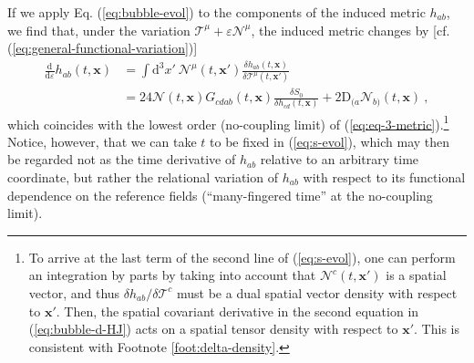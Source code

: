 \documentclass[12pt]{iopart}
\def\eq#1{\begin{equation}\begin{aligned}#1\end{aligned}\end{equation}}
\def\eref#1{(\ref{eq:#1})}
\def\D{\mathrm{d}}
\def\Del#1#2{\frac{\D#1}{\D#2}}
\def\N{\mathcal{N}}
\def\x{\mathbf{x}}
\def\T{\mathcal{T}}
\begin{document}
If we apply Eq. \eref{bubble-evol} to the components of the induced metric $h_{ab}$, we find that, under the variation $\T^{\mu}+\varepsilon\mathcal{N}^{\mu}$, the induced metric changes by [cf. \eref{general-functional-variation}]
\eq{\label{eq:s-evol}
\Del{}{\varepsilon}h_{ab}(t,\x) &= \int\D^3x'\ \N^{\mu}(t,\x')\frac{\delta h_{ab}(t,\x)}{\delta\T^{\mu}(t,\x')}\\
&=24\N(t,\x)G_{cdab}(t,\x)\frac{\delta S_0}{\delta h_{cd}(t,\x)} +2\mathrm{D}_{(a}\N_{b)}(t,\x) \ ,
}
which coincides with the lowest order (no-coupling limit) of \eref{eq-3-metric}.\footnote{To arrive at the last term of the second line of \eref{s-evol}, one can perform an integration by parts by taking into account that $\mathcal{N}^c(t,\x')$ is a spatial vector, and thus $\delta h_{ab}/\delta\mathcal{T}^{c}$ must be a dual spatial vector density with respect to $\x'$. Then, the spatial covariant derivative in the second equation in \eref{bubble-d-HJ} acts on a spatial tensor density with respect to $\x'$. This is consistent with Footnote \ref{foot:delta-density}.} Notice, however, that we can take $t$ to be fixed in \eref{s-evol}, which may then be regarded not as the time derivative of $h_{ab}$ relative to an arbitrary time coordinate, but rather the relational variation of $h_{ab}$ with respect to its functional dependence on the reference fields (``many-fingered time'' at the no-coupling limit).
\end{document}

